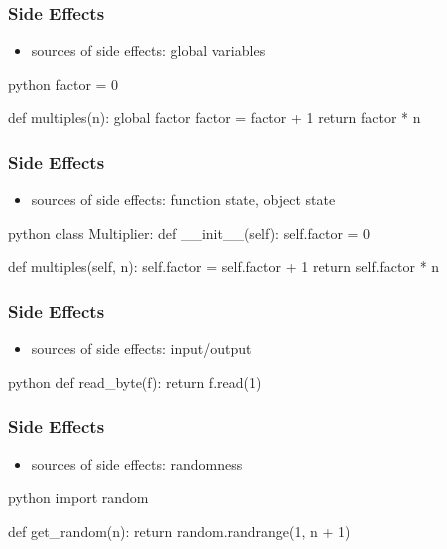 \documentclass[dvipsnames]{beamer}
\theoremstyle{plain}
\begin{document}
\begin{frame}[fragile]
  \frametitle{Side Effects}

  \begin{itemize}
    \item sources of side effects: global variables
  \end{itemize}

  \begin{exampleblock}{}
    \begin{pygments}{python}
factor = 0

def multiples(n):
    global factor
    factor = factor + 1
    return factor * n
      \end{pygments}
    \end{exampleblock}
\end{frame}

\begin{frame}[fragile]
  \frametitle{Side Effects}

  \begin{itemize}
    \item sources of side effects: function state, object state
  \end{itemize}

  \begin{exampleblock}{}
    \begin{pygments}{python}
class Multiplier:
    def __init__(self):
        self.factor = 0

    def multiples(self, n):
        self.factor = self.factor + 1
        return self.factor * n
    \end{pygments}
  \end{exampleblock}
\end{frame}

\begin{frame}[fragile]
  \frametitle{Side Effects}

  \begin{itemize}
    \item sources of side effects: input/output
  \end{itemize}

  \begin{exampleblock}{}
    \begin{pygments}{python}
def read_byte(f):
    return f.read(1)
    \end{pygments}
  \end{exampleblock}
\end{frame}

\begin{frame}[fragile]
  \frametitle{Side Effects}

  \begin{itemize}
    \item sources of side effects: randomness
  \end{itemize}

  \begin{exampleblock}{}
    \begin{pygments}{python}
import random

def get_random(n):
    return random.randrange(1, n + 1)
    \end{pygments}
  \end{exampleblock}
\end{frame}
\end{document}
